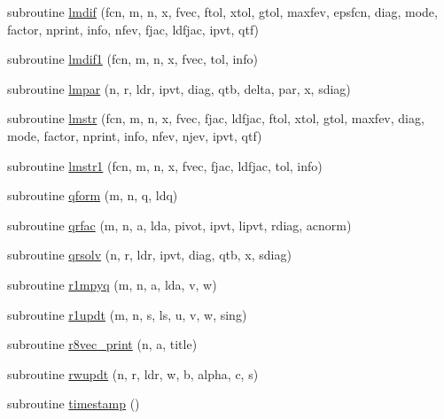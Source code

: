 \begin{DoxyCompactItemize}
\item 
subroutine \hyperlink{minpack_8f90_a9c1edc586c3518092e9531b199d646f3}{lmdif} (fcn, m, n, x, fvec, ftol, xtol, gtol, maxfev, epsfcn, diag, mode, factor, nprint, info, nfev, fjac, ldfjac, ipvt, qtf)
\item 
subroutine \hyperlink{minpack_8f90_a1b531c7b6b594b0eeaa71ca9fe779b0c}{lmdif1} (fcn, m, n, x, fvec, tol, info)
\item 
subroutine \hyperlink{minpack_8f90_a1dc1e9adda30350383f28f6cc6361365}{lmpar} (n, r, ldr, ipvt, diag, qtb, delta, par, x, sdiag)
\item 
subroutine \hyperlink{minpack_8f90_a178ff688f77b7192504790b6741ecd4d}{lmstr} (fcn, m, n, x, fvec, fjac, ldfjac, ftol, xtol, gtol, maxfev, diag, mode, factor, nprint, info, nfev, njev, ipvt, qtf)
\item 
subroutine \hyperlink{minpack_8f90_acee42ee803b3870261fa529dc123a892}{lmstr1} (fcn, m, n, x, fvec, fjac, ldfjac, tol, info)
\item 
subroutine \hyperlink{minpack_8f90_a12e8db1e181463d5c3af21f2b1b6b5a7}{qform} (m, n, q, ldq)
\item 
subroutine \hyperlink{minpack_8f90_a64d35f73f2a85378c24dd7b99ddb0c0f}{qrfac} (m, n, a, lda, pivot, ipvt, lipvt, rdiag, acnorm)
\item 
subroutine \hyperlink{minpack_8f90_a0dd208e826a2526722a40eab1724ac83}{qrsolv} (n, r, ldr, ipvt, diag, qtb, x, sdiag)
\item 
subroutine \hyperlink{minpack_8f90_ab7f6e61d92cfd9ea516435ad523b989b}{r1mpyq} (m, n, a, lda, v, w)
\item 
subroutine \hyperlink{minpack_8f90_a8ff726029b3ff9037b390910744ee58b}{r1updt} (m, n, s, ls, u, v, w, sing)
\item 
subroutine \hyperlink{minpack_8f90_adc196cc5030b2eb1660c061fd85bfe0a}{r8vec\_\-print} (n, a, title)
\item 
subroutine \hyperlink{minpack_8f90_adbcfef20d552d8c5e7dc5925c975eb23}{rwupdt} (n, r, ldr, w, b, alpha, c, s)
\item 
subroutine \hyperlink{minpack_8f90_a44fdaa08281ed3009542bc9257fa965d}{timestamp} ()
\end{DoxyCompactItemize}


